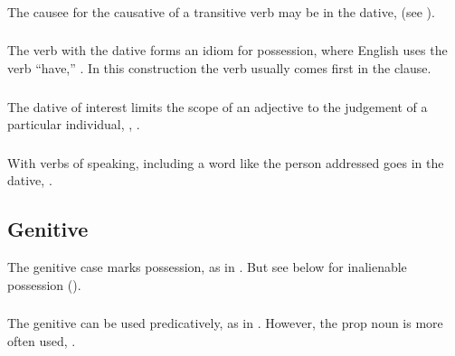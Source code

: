 \subsubsection{} The causee for the causative of a transitive verb may
be in the dative,   (see ). 

\subsubsection{} The verb  with the dative forms an idiom for
possession, where English uses the verb ``have,'' 
.  In this construction the verb usually comes
first in the clause.  

\subsubsection{} The dative of interest limits the scope of an
adjective to the judgement  of a particular
individual,  ,
 .

\subsubsection{} With verbs of speaking, including a word like
  the person addressed goes in the dative,  .

\subsection{Genitive} The genitive case marks possession, as in
 . But see below for
inalienable possession ().

\subsubsection{} The genitive can be used predicatively, as in
 .  How\-ever, the prop
noun   is more often used,
 . \label{syn:pum:genitive}

